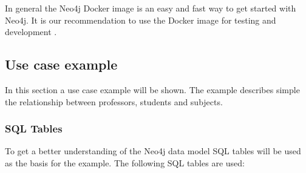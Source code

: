 In general the Neo4j Docker image is an easy and fast way to get started with
Neo4j. It is our recommendation to use the Docker image for testing and
development \cite{neo4j:docker}.

\subsection{Use case example}
In this section a use case example will be shown. The example describes simple
the relationship between professors, students and subjects.
\subsubsection{SQL Tables}
To get a better understanding of the Neo4j data model SQL tables will be used as
the basis for the example. The following SQL tables are used:

